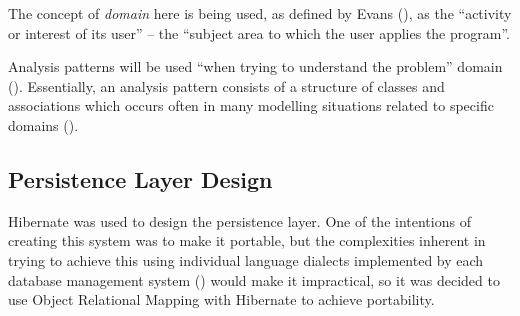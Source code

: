 The concept of \emph{domain} here is being used, as defined by Evans
(\citeyear[][p.~2]{evans2004domain}), as the ``activity or interest of its
user'' -- the ``subject area to which the user applies the program''.

Analysis patterns will be used ``when trying to understand the problem'' domain
(\cite[][Section~1.1]{fowler1997analysis}). Essentially, an analysis pattern
consists of a structure of classes and associations which occurs often in many
modelling situations related to specific domains
(\cite[][p.~254]{bennett2010object}).


\subsection{Persistence Layer Design}
Hibernate was used to design the persistence layer. One of the intentions of
creating this system was to make it portable, but the complexities inherent in
trying to achieve this using individual language dialects implemented by each
database management system (\cite[][p.~4]{bauer2016hibernate}) would make it
impractical, so it was decided to use Object Relational Mapping with Hibernate
to achieve portability.
